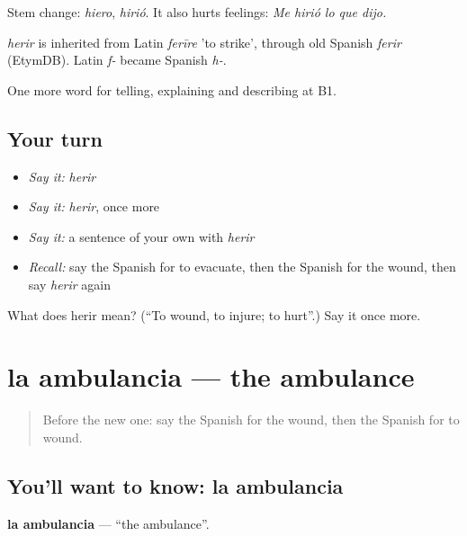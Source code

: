 Stem change: \emph{hiero}, \emph{hirió}. It also hurts feelings: \emph{Me hirió lo que dijo.}

\begin{cousinweb}
\emph{herir} is inherited from Latin \emph{ferīre} 'to strike', through old Spanish \emph{ferir} (EtymDB). Latin \emph{f-} became Spanish \emph{h-}.
\end{cousinweb}

\begin{grammarlens}[title={What you've built}]
One more word for telling, explaining and describing at B1.
\end{grammarlens}

\subsection*{Your turn}
\begin{itemize}
\raggedright
  \item \emph{Say it:} \emph{herir}
  \item \emph{Say it:} \emph{herir}, once more
  \item \emph{Say it:} a sentence of your own with \emph{herir}
  \item \emph{Recall:} say the Spanish for to evacuate, then the Spanish for the wound, then say \emph{herir} again
\end{itemize}

\begin{tcolorbox}[breakable,colback=teal!4,colframe=teal!35!black,title={Before you move on}]
What does herir mean? (\textquotedblleft{}To wound, to injure; to hurt\textquotedblright{}.) Say it once more.
\end{tcolorbox}
\section[la ambulancia]{la ambulancia — the ambulance}

\label{lesson:ES-C525-ambulancia}



\begin{quote}
Before the new one: say the Spanish for the wound, then the Spanish for to wound.
\end{quote}

\subsection*{You'll want to know: la ambulancia}
\textbf{la ambulancia} — \textquotedblleft{}the ambulance\textquotedblright{}.

